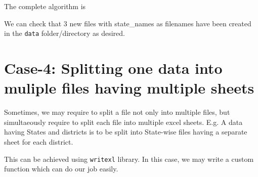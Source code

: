 \documentclass[
]{book}
\newenvironment{Shaded}{\begin{snugshade}}{\end{snugshade}}
\newcommand{\CommentTok}[1]{\textcolor[rgb]{0.56,0.35,0.01}{\textit{#1}}}
\newcommand{\FunctionTok}[1]{\textcolor[rgb]{0.13,0.29,0.53}{\textbf{#1}}}
\newcommand{\NormalTok}[1]{#1}
\newcommand{\OtherTok}[1]{\textcolor[rgb]{0.56,0.35,0.01}{#1}}
\newcommand{\SpecialCharTok}[1]{\textcolor[rgb]{0.81,0.36,0.00}{\textbf{#1}}}
\newcommand{\StringTok}[1]{\textcolor[rgb]{0.31,0.60,0.02}{#1}}
\begin{document}
The complete algorithm is

\begin{Shaded}
\end{Shaded}

We can check that 3 new files with state\_names as filenames have been created in the \texttt{data} folder/directory as desired.

\hypertarget{case-4-splitting-one-data-into-muliple-files-having-multiple-sheets}{%
\section{\texorpdfstring{\textbf{Case-4}: Splitting one data into muliple files having multiple sheets}{Case-4: Splitting one data into muliple files having multiple sheets}}\label{case-4-splitting-one-data-into-muliple-files-having-multiple-sheets}}

Sometimes, we may require to split a file not only into multiple files, but simultaeously require to split each file into multiple excel sheets. E.g. A data having States and districts is to be split into State-wise files having a separate sheet for each district.

This can be achieved using \texttt{writexl} library. In this case, we may write a custom function which can do our job easily.
\end{document}
